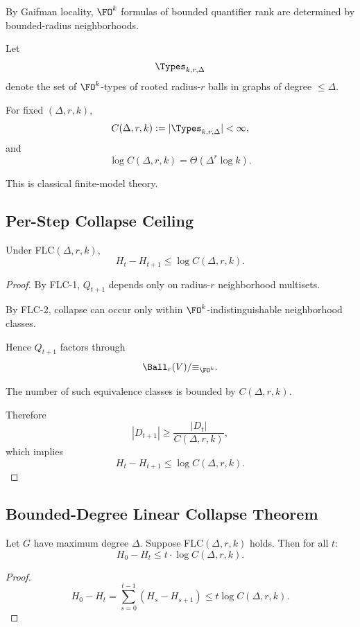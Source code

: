 By Gaifman locality,
$\FO^k$ formulas of bounded quantifier rank
are determined by bounded-radius neighborhoods.

Let
\[
\Types_{k,r,\Delta}
\]
denote the set of $\FO^k$-types of rooted
radius-$r$ balls in graphs of degree $\le \Delta$.

\begin{lemma}
For fixed $(\Delta,r,k)$,
\[
C(\Delta,r,k)
:=
|\Types_{k,r,\Delta}|
< \infty,
\]
and
\[
\log C(\Delta,r,k)
=
\Theta(\Delta^r \log k).
\]
\end{lemma}

This is classical finite-model theory.

\subsection{Per-Step Collapse Ceiling}

\begin{lemma}
Under FLC$(\Delta,r,k)$,
\[
H_t - H_{t+1}
\le
\log C(\Delta,r,k).
\]
\end{lemma}

\begin{proof}
By FLC-1, $Q_{t+1}$ depends only on
radius-$r$ neighborhood multisets.

By FLC-2, collapse can occur only within
$\FO^k$-indistinguishable neighborhood classes.

Hence $Q_{t+1}$ factors through
\[
\Ball_r(V) / {\equiv_{\FO^k}}.
\]

The number of such equivalence classes
is bounded by $C(\Delta,r,k)$.

Therefore
\[
|D_{t+1}|
\ge
\frac{|D_t|}{C(\Delta,r,k)},
\]
which implies
\[
H_t - H_{t+1}
\le
\log C(\Delta,r,k).
\]
\end{proof}

\subsection{Bounded-Degree Linear Collapse Theorem}

\begin{theorem}
\label{thm:bounded_degree_linear}
Let $G$ have maximum degree $\Delta$.
Suppose FLC$(\Delta,r,k)$ holds.
Then for all $t$:
\[
H_0 - H_t
\le
t \cdot \log C(\Delta,r,k).
\]
\end{theorem}

\begin{proof}
\[
H_0 - H_t
=
\sum_{s=0}^{t-1}
(H_s - H_{s+1})
\le
t \log C(\Delta,r,k).
\]
\end{proof}

